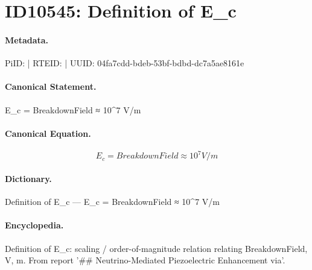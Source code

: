 \section*{ID10545: Definition of E\_c}
\paragraph{Metadata.}
PiID:  | RTEID:  | UUID: 04fa7cdd-bdeb-53bf-bdbd-dc7a5ae8161e

\paragraph{Canonical Statement.}
E\_c = BreakdownField ≈ 10\textasciicircum{}7 V/m

\paragraph{Canonical Equation.}
\[
E_c = BreakdownField ≈ 10^7 V/m
\]

\paragraph{Dictionary.}
Definition of E\_c — E\_c = BreakdownField ≈ 10\textasciicircum{}7 V/m

\paragraph{Encyclopedia.}
Definition of E\_c: scaling / order-of-magnitude relation relating BreakdownField, V, m. From report '\#\# Neutrino-Mediated Piezoelectric Enhancement via'.
